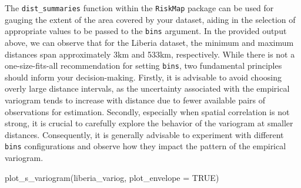 \documentclass[
  letterpaper,
]{krantz}
\newenvironment{Shaded}{\begin{snugshade}}{\end{snugshade}}
\newcommand{\AttributeTok}[1]{\textcolor[rgb]{0.40,0.45,0.13}{#1}}
\newcommand{\ConstantTok}[1]{\textcolor[rgb]{0.56,0.35,0.01}{#1}}
\newcommand{\DocumentationTok}[1]{\textcolor[rgb]{0.37,0.37,0.37}{\textit{#1}}}
\newcommand{\FunctionTok}[1]{\textcolor[rgb]{0.28,0.35,0.67}{#1}}
\newcommand{\NormalTok}[1]{\textcolor[rgb]{0.00,0.23,0.31}{#1}}
\begin{document}
\begin{Shaded}
\end{Shaded}

The \texttt{dist\_summaries} function within the \texttt{RiskMap}
package can be used for gauging the extent of the area covered by your
dataset, aiding in the selection of appropriate values to be passed to
the \texttt{bins} argument. In the provided output above, we can observe
that for the Liberia dataset, the minimum and maximum distances span
approximately 3km and 533km, respectively. While there is not a
one-size-fits-all recommendation for setting \texttt{bins}, two
fundamental principles should inform your decision-making. Firstly, it
is advisable to avoid choosing overly large distance intervals, as the
uncertainty associated with the empirical variogram tends to increase
with distance due to fewer available pairs of observations for
estimation. Secondly, especially when spatial correlation is not strong,
it is crucial to carefully explore the behavior of the variogram at
smaller distances. Consequently, it is generally advisable to experiment
with different \texttt{bins} configurations and observe how they impact
the pattern of the empirical variogram.

\begin{Shaded}
\begin{Highlighting}[]
\FunctionTok{plot\_s\_variogram}\NormalTok{(liberia\_variog,}
                 \AttributeTok{plot\_envelope =} \ConstantTok{TRUE}\NormalTok{)}
\end{Highlighting}
\end{Shaded}
\end{document}
